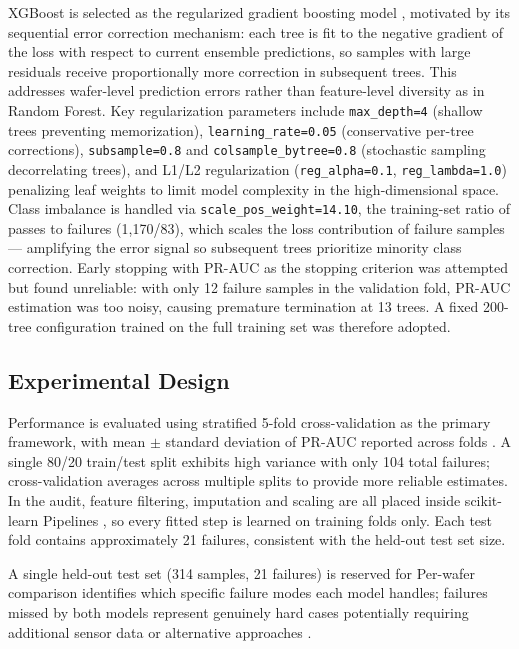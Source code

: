 \documentclass[conference]{IEEEtran}
\begin{document}
XGBoost is selected as the regularized gradient boosting model 
\cite{chen2016xgboost}, motivated by its 
sequential error correction mechanism: each tree is fit to the 
negative gradient of the loss with respect to current ensemble 
predictions, so samples with large residuals receive proportionally 
more correction in subsequent trees. This addresses wafer-level 
prediction errors rather than feature-level diversity as in Random 
Forest. Key regularization parameters include 
\texttt{max\_depth=4} (shallow trees preventing memorization), 
\texttt{learning\_rate=0.05} (conservative per-tree corrections), 
\texttt{subsample=0.8} and \texttt{colsample\_bytree=0.8} 
(stochastic sampling decorrelating trees), and L1/L2 regularization 
(\texttt{reg\_alpha=0.1}, \texttt{reg\_lambda=1.0}) penalizing leaf 
weights to limit model complexity in the high-dimensional space. 
Class imbalance is handled via \texttt{scale\_pos\_weight=14.10}, 
the training-set ratio of passes to failures (1,170/83), which 
scales the loss contribution of failure samples --- amplifying the 
error signal so subsequent trees prioritize minority class 
correction. Early stopping with PR-AUC as the stopping criterion was 
attempted but found unreliable: with only 12 failure samples in 
the validation fold, PR-AUC estimation was too noisy, causing 
premature termination at 13 trees. A fixed 200-tree configuration 
trained on the full training set was therefore adopted.

\subsection{Experimental Design}

Performance is evaluated using stratified 5-fold cross-validation 
as the primary framework, with mean $\pm$ standard deviation of 
PR-AUC reported across folds \cite{kim2017feature}. A single 80/20 
train/test split exhibits high variance with only 104 total 
failures; cross-validation averages across multiple splits to 
provide more reliable estimates. In the audit, feature filtering, imputation and scaling are all
placed inside scikit-learn Pipelines \cite{pedregosa2011scikit}, so
every fitted step is learned on training folds only. Each test fold contains 
approximately 21 failures, consistent with the held-out test 
set size.

A single held-out test set (314 samples, 21 failures) is reserved 
for Per-wafer comparison identifies which specific failure modes each
model handles; failures missed by both models represent genuinely
hard cases potentially requiring additional sensor data or
alternative approaches \cite{busch2022yield}.
\end{document}

